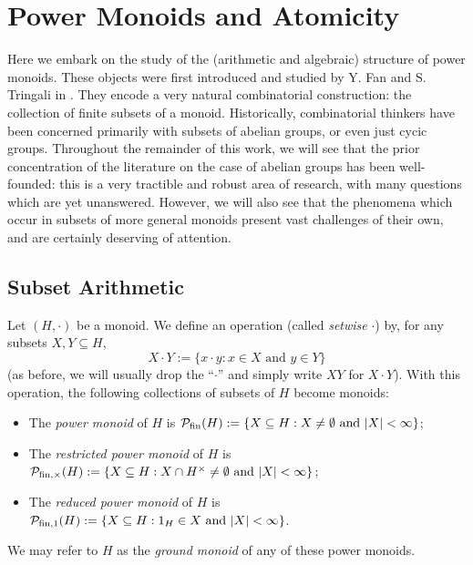 \chapter{Power Monoids and Atomicity} \label{ch:power monoids}

Here we embark on the study of the (arithmetic and algebraic) structure of power monoids.
These objects were first introduced and studied by Y. Fan and S. Tringali in \cite{fan-tringali18}.
They encode a very natural combinatorial construction: the collection of finite subsets of a monoid.  
Historically, combinatorial thinkers have been concerned primarily with subsets of abelian groups, or even just cycic groups.  
Throughout the remainder of this work, we will see that the prior concentration of the literature on the case of abelian groups has been well-founded: 
this is a very tractible and robust area of research, with many questions which are yet unanswered.
However, we will also see that the phenomena which occur in subsets of more general monoids present vast challenges of their own, and are certainly deserving of attention.

\section{Subset Arithmetic} \label{sec:pm basics}

\begin{defn} \label{def:power monoid}
	Let $(H,\cdot)$ be a monoid.
	We define an operation (called \textit{setwise} $\cdot$) by, for any subsets $X,Y\subseteq H$,
	\[X\cdot Y := \{x\cdot y: x\in X \textrm{ and } y\in Y\} \]
	(as before, we will usually drop the ``$\cdot$'' and simply write $XY$ for $X\cdot Y$).
	With this operation, the following collections of subsets of $H$ become monoids:
\begin{itemize}
	\item The \textit{power monoid} of $H$ is $\mathcal{P}_{\textrm{fin}}(H) := \{X\subseteq H: X\neq\emptyset \textrm{ and } |X|<\infty \}$;
	\item The \textit{restricted power monoid} of $H$ is $\mathcal{P}_{\textrm{fin}, \times}(H) := \{X\subseteq H: X\cap H^\times \neq \emptyset \textrm{ and } |X|<\infty\}$;
	\item The \textit{reduced power monoid} of $H$ is $\mathcal{P}_{\textrm{fin}, 1}(H) := \{X\subseteq H: 1_H\in X \textrm{ and } |X|<\infty\}$.
\end{itemize}
	We may refer to $H$ as the \textit{ground monoid} of any of these power monoids.
\end{defn}


